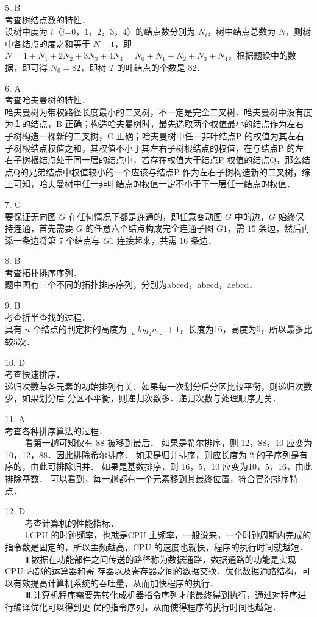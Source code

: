 5. B \\
考查树结点数的特性． \\
设树中度为 $i$（$i$=$0$，$1$，$2$，$3$，$4$）的结点数分别为 $N_i$，树中结点总数为 $N$，则树中各结点的度之和等于 $N-1$，即 $N=1+N_1+2N_2+3N_3+4N_4=N_0+N_1+N_2+N_3+N_4$，根据题设中的数据，即可得 $N_0=82$，即树 $T$ 的叶结点的个数是 $82$．

6. A \\
考查哈夫曼树的特性． \\
哈夫曼树为带权路径长度最小的二叉树，不一定是完全二叉树．哈夫曼树中没有度为１的结点，B 正确；构造哈夫曼树时，最先选取两个权值最小的结点作为左右子树构造一棵新的二叉树，C 正确；哈夫曼树中任一非叶结点P 的权值为其左右子树根结点权值之和，其权值不小于其左右子树根结点的权值，在与结点P 的左右子树根结点处于同一层的结点中，若存在权值大于结点P 权值的结点Q，那么结点Q的兄弟结点中权值较小的一个应该与结点P 作为左右子树构造新的二叉树，综上可知，哈夫曼树中任一非叶结点的权值一定不小于下一层任一结点的权值．

7. C \\
要保证无向图 $G$ 在任何情况下都是连通的，即任意变动图 $G$ 中的边，$G$ 始终保持连通，首先需要 $G$ 的任意六个结点构成完全连通子图 $G1$，需 $15$ 条边，然后再添一条边将第 $7$ 个结点与 $G1$ 连接起来，共需 $16$ 条边．

8. B \\
考查拓扑排序序列． \\
题中图有三个不同的拓扑排序序列，分别为abced，abecd，aebcd．

9. B \\
考查折半查找的过程． \\
具有 $n$ 个结点的判定树的高度为 $\llcorner log_2n\lrcorner+1$，长度为16，高度为5，所以最多比较5次．

10. D \\
考查快速排序． \\
递归次数与各元素的初始排列有关．如果每一次划分后分区比较平衡，则递归次数少，如果划分后
分区不平衡，则递归次数多．递归次数与处理顺序无关．

11. A \\
考查各种排序算法的过程．\\
$\qquad$ 看第一趟可知仅有 88 被移到最后．
如果是希尔排序，则 12，88，10 应变为10，12，88．因此排除希尔排序．
如果是归并排序，则应长度为 2 的子序列是有序的，由此可排除归并．
如果是基数排序，则 16，5，10 应变为10，5，16，由此排除基数．
可以看到，每一趟都有一个元素移到其最终位置，符合冒泡排序特点．

12. D \\
$\qquad$ 考查计算机的性能指标．\\
$\qquad$ Ⅰ.CPU 的时钟频率，也就是CPU 主频率，一般说来，一个时钟周期内完成的指令数是固定的，所以主频越高，CPU 的速度也就快，程序的执行时间就越短．\\
$\qquad$ Ⅱ.数据在功能部件之间传送的路径称为数据通路，数据通路的功能是实现CPU 内部的运算器和寄
存器以及寄存器之间的数据交换．优化数据通路结构，可以有效提高计算机系统的吞吐量，从而加快程序的执行．\\
$\qquad$ Ⅲ.计算机程序需要先转化成机器指令序列才能最终得到执行，通过对程序进行编译优化可以得到更
优的指令序列，从而使得程序的执行时间也越短．

